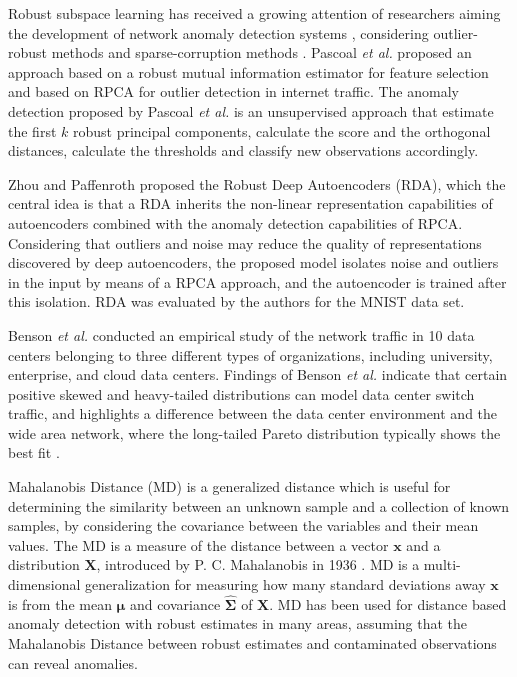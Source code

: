Robust subspace learning has received a growing attention of researchers aiming the development of network anomaly detection systems \cite{ hubert2009robustskewed, pascoal2012robust, zhou2017anomaly}, considering outlier-robust methods and sparse-corruption methods \cite{lerman2018overview}. Pascoal \emph{et al.} \cite{pascoal2012robust} proposed an approach based on a robust mutual information estimator for feature selection and based on RPCA for outlier detection in internet traffic. The anomaly detection proposed by Pascoal \emph{et al.} is an unsupervised approach that estimate the first $k$ robust principal components, calculate the score and the orthogonal distances, calculate the thresholds and classify new observations accordingly. 

Zhou and Paffenroth \cite{zhou2017anomaly} proposed the Robust Deep Autoencoders (RDA), which the central idea is that a RDA inherits the non-linear representation capabilities of autoencoders combined with the anomaly detection capabilities of RPCA. Considering that outliers and noise may reduce the quality of representations discovered by deep autoencoders, the proposed model isolates noise and outliers in the input by means of a RPCA approach, and the autoencoder is trained after this isolation. RDA was evaluated by the authors for the MNIST data set.

Benson \emph{et al.} \cite{benson2010network} conducted an empirical study of the network traffic in 10 data centers belonging to three different types of organizations, including university, enterprise, and cloud data centers. Findings of Benson \emph{et al.} indicate that certain positive skewed and heavy-tailed distributions can model data center switch traffic, and highlights a difference between the data center environment and the wide area network, where the long-tailed Pareto distribution typically shows the best fit \cite{benson2010network}.

Mahalanobis Distance (MD) is a generalized distance which is useful for determining the similarity between an unknown sample and a collection of known samples, by considering the covariance between the variables and their mean values. The MD is a measure of the distance between a vector $\pmb{x}$ and a distribution $\pmb{X}$, introduced by P. C. Mahalanobis in 1936 \cite{mahalanobis1936md}. MD is a multi-dimensional generalization for measuring how many standard deviations away $\pmb{x}$ is from the mean $\pmb{\mu}$ and covariance $\hat{\pmb{\Sigma}}$ of $\pmb{X}$. MD has been used for distance based anomaly detection with robust estimates in many areas, assuming that the Mahalanobis Distance between robust estimates and contaminated observations can reveal anomalies.

